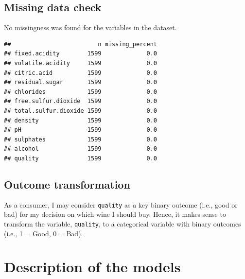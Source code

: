 \documentclass[
  english,
  man]{apa6}
\newenvironment{Shaded}{\begin{snugshade}}{\end{snugshade}}
\newcommand{\DecValTok}[1]{\textcolor[rgb]{0.00,0.00,0.81}{#1}}
\newcommand{\FunctionTok}[1]{\textcolor[rgb]{0.00,0.00,0.00}{#1}}
\newcommand{\NormalTok}[1]{#1}
\newcommand{\OtherTok}[1]{\textcolor[rgb]{0.56,0.35,0.01}{#1}}
\newcommand{\SpecialCharTok}[1]{\textcolor[rgb]{0.00,0.00,0.00}{#1}}
\begin{document}
\hypertarget{missing-data-check}{%
\subsection{Missing data check}\label{missing-data-check}}

No missingness was found for the variables in the dataset.

\begin{verbatim}
##                         n missing_percent
## fixed.acidity        1599             0.0
## volatile.acidity     1599             0.0
## citric.acid          1599             0.0
## residual.sugar       1599             0.0
## chlorides            1599             0.0
## free.sulfur.dioxide  1599             0.0
## total.sulfur.dioxide 1599             0.0
## density              1599             0.0
## pH                   1599             0.0
## sulphates            1599             0.0
## alcohol              1599             0.0
## quality              1599             0.0
\end{verbatim}

\hypertarget{outcome-transformation}{%
\subsection{Outcome transformation}\label{outcome-transformation}}

As a consumer, I may consider \texttt{quality} as a key binary outcome (i.e., good or bad) for my decision on which wine I should buy. Hence, it makes sense to transform the variable, \texttt{quality}, to a categorical variable with binary outcomes (i.e., 1 = Good, 0 = Bad).

\begin{Shaded}
\end{Shaded}

\hypertarget{description-of-the-models}{%
\section{Description of the models}\label{description-of-the-models}}
\end{document}
